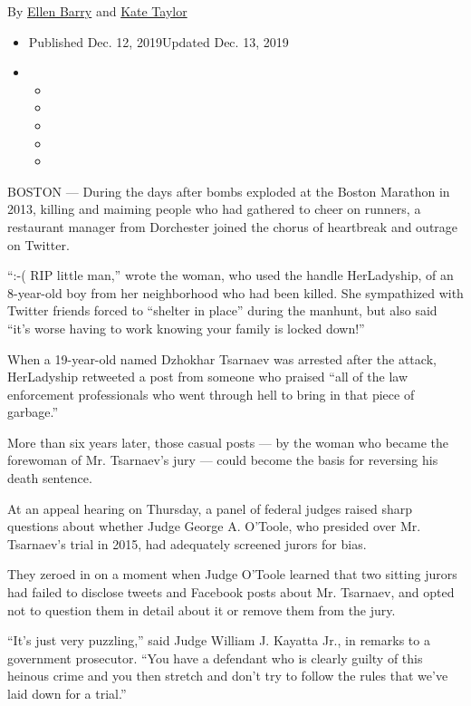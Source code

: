 By \href{https://www.nytimes.com/by/ellen-barry}{Ellen Barry} and
\href{https://www.nytimes.com/by/kate-taylor}{Kate Taylor}

\begin{itemize}
\item
  Published Dec. 12, 2019Updated Dec. 13, 2019
\item
  \begin{itemize}
  \item
  \item
  \item
  \item
  \item
  \end{itemize}
\end{itemize}

BOSTON --- During the days after bombs exploded at the Boston Marathon
in 2013, killing and maiming people who had gathered to cheer on
runners, a restaurant manager from Dorchester joined the chorus of
heartbreak and outrage on Twitter.

``:-( RIP little man,'' wrote the woman, who used the handle
HerLadyship, of an 8-year-old boy from her neighborhood who had been
killed. She sympathized with Twitter friends forced to ``shelter in
place'' during the manhunt, but also said ``it's worse having to work
knowing your family is locked down!''

When a 19-year-old named Dzhokhar Tsarnaev was arrested after the
attack, HerLadyship retweeted a post from someone who praised ``all of
the law enforcement professionals who went through hell to bring in that
piece of garbage.''

More than six years later, those casual posts --- by the woman who
became the forewoman of Mr. Tsarnaev's jury --- could become the basis
for reversing his death sentence.

At an appeal hearing on Thursday, a panel of federal judges raised sharp
questions about whether Judge George A. O'Toole, who presided over Mr.
Tsarnaev's trial in 2015, had adequately screened jurors for bias.

They zeroed in on a moment when Judge O'Toole learned that two sitting
jurors had failed to disclose tweets and Facebook posts about Mr.
Tsarnaev, and opted not to question them in detail about it or remove
them from the jury.

``It's just very puzzling,'' said Judge William J. Kayatta Jr., in
remarks to a government prosecutor. ``You have a defendant who is
clearly guilty of this heinous crime and you then stretch and don't try
to follow the rules that we've laid down for a trial.''

